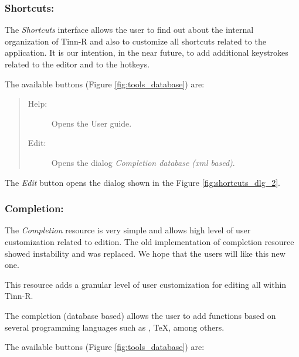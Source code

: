 \subsubsection{Shortcuts:}

The \textit{Shortcuts} interface allows the user to find out about
the internal organization of Tinn-R and also to customize all
shortcuts related to the application. It is our intention, in
the near future, to add additional keystrokes related to the
editor and to the \RR{} hotkeys.

The available buttons
(Figure \ref{fig:tools_database})
are:

\begin{quote}
  \begin{footnotesize}
    \begin{description}
      \item[Help:]
        Opens the User guide.
      \item[Edit:]
        Opens the dialog \textit{Completion database (xml based)}.
    \end{description}
  \end{footnotesize}
\end{quote}

The \textit{Edit} button opens the dialog shown in the Figure \ref{fig:shortcuts_dlg_2}.


\subsubsection{Completion:}

The \textit{Completion} resource is very simple and allows high level
of user customization related to edition. The old implementation of
completion resource showed instability and was replaced. We hope that
the users will like this new one.

This resource adds a granular level of user customization for editing
all within Tinn-R.

The completion (database based) allows the user to add functions based
on several programming languages such as \RR{}, \TeX, among others.

The available buttons
(Figure \ref{fig:tools_database})
are:

